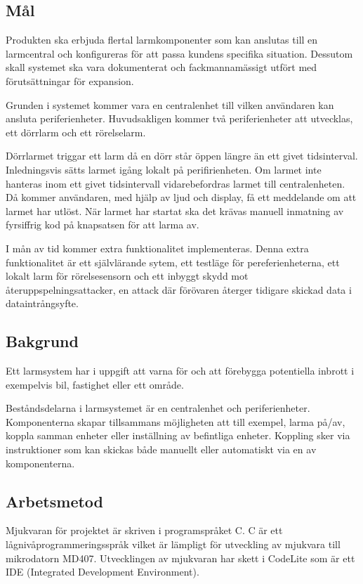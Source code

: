 \documentclass[a4paper]{article}
\begin{document}
\subsection{Mål}

Produkten ska erbjuda flertal larmkomponenter som kan anslutas till en larmcentral och konfigureras för att passa kundens specifika situation.
Dessutom skall systemet ska vara dokumenterat och fackmannamässigt utfört med förutsättningar för expansion.

Grunden i systemet kommer vara en centralenhet till vilken användaren kan ansluta periferienheter.
Huvudsakligen kommer två periferienheter att utvecklas, ett dörrlarm och ett rörelselarm.

Dörrlarmet triggar ett larm då en dörr står öppen längre än ett givet tidsinterval.
Inledningsvis sätts larmet igång lokalt på perifirienheten.
Om larmet inte hanteras inom ett givet tidsintervall vidarebefordras larmet till centralenheten.
Då kommer användaren, med hjälp av ljud och display, få ett meddelande om att larmet har utlöst.
När larmet har startat ska det krävas manuell inmatning av fyrsiffrig kod på knapsatsen för att larma av.

I mån av tid kommer extra funktionalitet implementeras. Denna extra funktionalitet är ett självlärande sytem, ett testläge för pereferienheterna, ett lokalt larm för rörelsesensorn och ett inbyggt skydd mot återuppspelningsattacker, en attack där förövaren återger tidigare skickad data i dataintrångsyfte.

\subsection{Bakgrund}
Ett larmsystem har i uppgift att varna för och att förebygga potentiella inbrott i exempelvis bil, fastighet eller ett område.

Beståndsdelarna i larmsystemet är en centralenhet och periferienheter.
Komponenterna skapar tillsammans möjligheten att till exempel, larma på/av, koppla samman enheter eller inställning av befintliga enheter.
Koppling sker via instruktioner som kan skickas både manuellt eller automatiskt via en av komponenterna.

\subsection{Arbetsmetod}

Mjukvaran för projektet är skriven i programspråket C.
C är ett lågnivåprogrammeringsspråk vilket är lämpligt för utveckling av mjukvara till mikrodatorn MD407.
Utvecklingen av mjukvaran har skett i CodeLite som är ett IDE (Integrated Development Environment).
\end{document}
